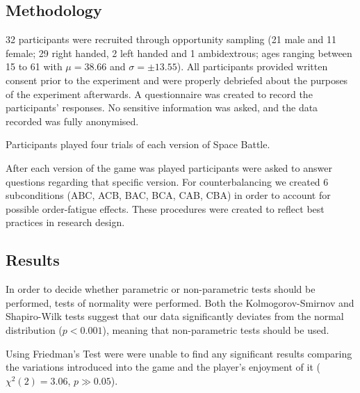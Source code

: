 \subsection{Methodology}

32 participants were recruited through opportunity sampling (21 male and 11 female; 29 right handed, 2 left handed and 1 ambidextrous; ages ranging between 15 to 61 with $\mu= 38.66$ and  $\sigma = \pm 13.55$). All participants provided written consent prior to the experiment and were properly debriefed about the purposes of the experiment afterwards. A questionnaire was created to record the participants' responses. No sensitive information was asked, and the data recorded was fully anonymised. 

Participants played four trials of each version of Space Battle.

After each version of the game was played participants were asked to answer questions regarding that specific version. For counterbalancing we created 6 subconditions (ABC, ACB, BAC, BCA, CAB, CBA) in order to account for possible order-fatigue effects. These procedures were created to reflect best practices in research design.


\subsection{Results}

In order to decide whether parametric or non-parametric tests should be performed, tests of normality were performed. Both the Kolmogorov-Smirnov and Shapiro-Wilk tests suggest that our data significantly deviates from the normal distribution ($p < 0.001$), meaning that non-parametric tests should be used.

Using Friedman's Test were were unable to find any significant results comparing the variations introduced into the game and the player's enjoyment of it ($\chi^2(2) = 3.06$, $p \gg 0.05$).